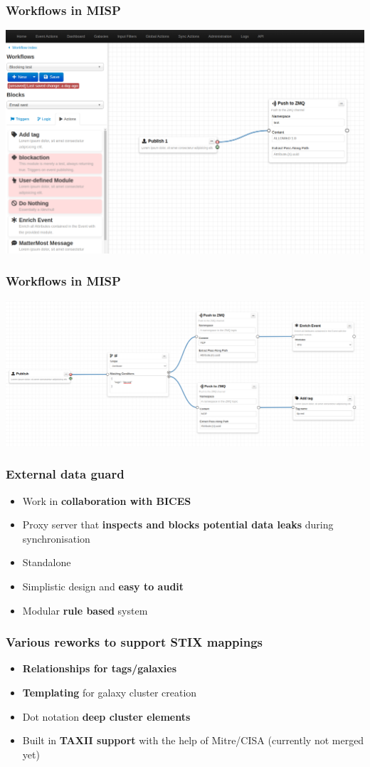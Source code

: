 \begin{frame}
\frametitle{Workflows in MISP}
\includegraphics[scale=0.2]{images/workflows1.png}
\end{frame}

\begin{frame}
\frametitle{Workflows in MISP}
\includegraphics[scale=0.2]{images/workflows2.png}
\end{frame}


\begin{frame}
  \frametitle{External data guard}
  \begin{itemize}
     \item Work in {\bf collaboration with BICES}
     \item Proxy server that {\bf inspects and blocks potential data leaks} during synchronisation
     \item Standalone
     \item Simplistic design and {\bf easy to audit}
     \item Modular {\bf rule based} system
  \end{itemize}
\end{frame}

\begin{frame}
  \frametitle{Various reworks to support STIX mappings}
  \begin{itemize}
     \item {\bf Relationships for tags/galaxies}
     \item {\bf Templating} for galaxy cluster creation
     \item Dot notation {\bf deep cluster elements}
     \item Built in {\bf TAXII support} with the help of Mitre/CISA (currently not merged yet)
  \end{itemize}
\end{frame}

